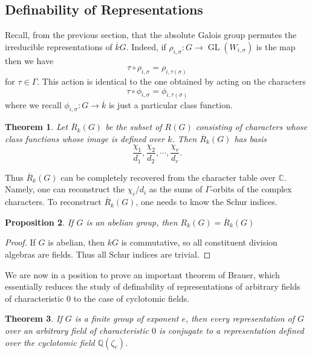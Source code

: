 \documentclass[12pt]{article}
\theoremstyle{plain}
\newtheorem{theorem}{Theorem}[section]
\newtheorem{proposition}[theorem]{Proposition}
\theoremstyle{definition}
\theoremstyle{remark}
\numberwithin{equation}{section}
\begin{document}
\subsection{Definability of Representations}

Recall, from the previous section, that the absolute Galois group
permutes the irreducible representations of $\overline{k}G$.
Indeed, if $\rho_{i,\sigma} : G \to \operatorname{GL}(W_{i,\sigma})$
is the map then we have
\[
\tau \circ \rho_{i,\sigma} = \rho_{i,\tau(\sigma)}
\]
for $\tau \in \Gamma$.
This action is identical to the one obtained by acting on the
characters
\[
\tau \circ \phi_{i,\sigma} = \phi_{i,\tau(\sigma)}
\]
where we recall $\phi_{i,\sigma}: G \to \overline{k}$ is just a
particular class function.

\begin{theorem}
Let $\overline{R}_k(G)$ be the subset of $R(G)$ consisting of characters
whose class functions whose image is defined over $k$.
Then $\overline{R}_k(G)$ has basis
\[
\frac{\chi_1}{d_1},
\frac{\chi_2}{d_2},
\cdots,
\frac{\chi_r}{d_r}.
\]
\end{theorem}

Thus $\overline{R}_k(G)$ can be completely recovered from the character
table over $\mathbb{C}$.  Namely, one can reconstruct the $\chi_i/d_i$
as the sums of $\Gamma$-orbits of the complex characters.
To reconstruct $\overline{R}_k(G)$, one needs to know the Schur indices.

\begin{proposition}
If $G$ is an abelian group,
then $R_k(G) = \overline{R}_k(G)$
\end{proposition}

\begin{proof}
If $G$ is abelian, then $kG$ is commutative, so all constituent
division algebras are fields.  Thus all Schur indices are trivial.
\end{proof}

We are now in a position to prove an important theorem of Brauer, which
essentially reduces the study of definability of representations of
arbitrary fields of characteristic $0$ to the case of cyclotomic fields.

\begin{theorem}
If $G$ is a finite group of exponent $e$,
then every representation of $G$ over an arbitrary field of
characteristic $0$
is conjugate to a representation defined over the
cyclotomic field $\mathbb{Q}(\zeta_e)$.
\end{theorem}
\end{document}
